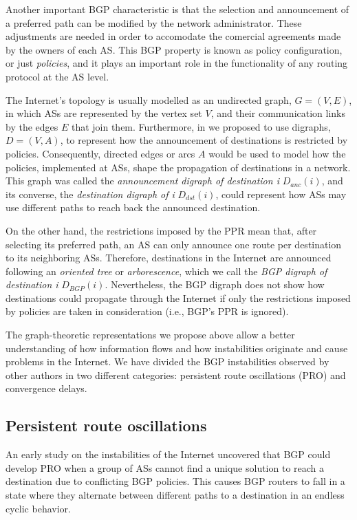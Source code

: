 \documentclass[5p,twocolumn]{elsarticle}
\begin{document}
Another important BGP characteristic is that the selection and announcement of a preferred path  can be modified by the network administrator. These adjustments are needed in order to accomodate the comercial agreements made by the owners of each AS. This BGP property is known as policy configuration, or just \emph{policies}, and it plays an important role in the functionality of any routing protocol at the AS level.

The Internet's topology is usually modelled as an undirected graph, $G=(V,E)$, in which ASs are represented by the vertex set $V$, and their communication links by the edges $E$ that join them. Furthermore, in \cite{Arjona-Villicana2010} we proposed to use digraphs, $D=(V,A)$, to represent how the announcement of destinations is restricted by policies. Consequently, directed edges or arcs $A$ would be used to model how the policies, implemented at ASs, shape the propagation of destinations in a network. This graph was called the \emph{announcement digraph of destination i} $D_{anc}(i)$, and its converse, the \emph{destination digraph of i} $D_{dst}(i)$, could represent how ASs may use different paths to reach back the announced destination.

On the other hand, the restrictions imposed by the PPR mean that, after selecting its preferred path, an AS can only announce one route per destination to its neighboring ASs. Therefore, destinations in the Internet are announced following an \emph{oriented tree} or \emph{arborescence}, which we call the \emph{BGP digraph of destination i} $D_{BGP}(i)$. Nevertheless, the BGP digraph does not show how destinations could propagate through the Internet if only the restrictions imposed by policies are taken in consideration (i.e., BGP's PPR is ignored).

The graph-theoretic representations we propose above allow a better understanding of how information flows and how instabilities originate and cause problems in the Internet. We have divided the BGP instabilities observed by other authors in two different categories: persistent route oscillations (PRO) and convergence delays.


\subsection{Persistent route oscillations}\label{pro}

An early study on the instabilities of the Internet \cite{Varadhan1996} uncovered that BGP could develop PRO when a group of ASs cannot find a unique solution to reach a destination due to conflicting BGP policies. This causes BGP routers to fall in a state where they alternate between different paths to a destination in an endless cyclic behavior.
\end{document}
